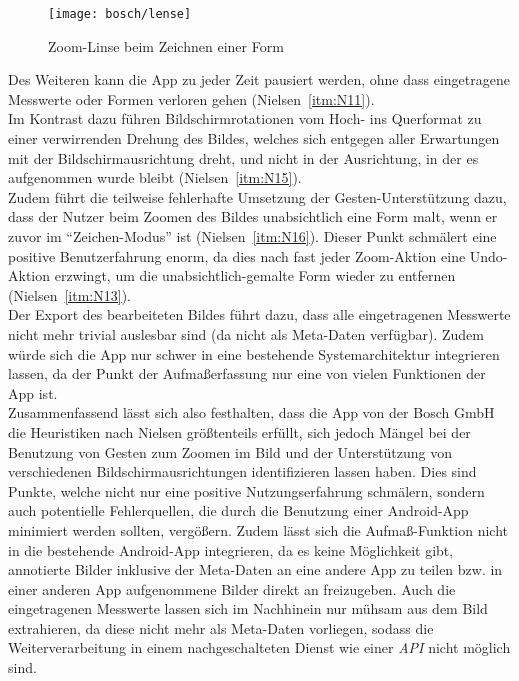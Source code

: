 \begin{wrapfigure}{R}{0.5\textwidth}
  \centering
  \texttt{[image: bosch/lense]}
  \caption{Zoom-Linse beim Zeichnen einer Form}
  \label{fig:blense}
\end{wrapfigure}

Des Weiteren kann die App zu jeder Zeit pausiert werden, ohne dass eingetragene Messwerte oder Formen verloren gehen (Nielsen~\autoref{itm:N11}). \\

Im Kontrast dazu führen Bildschirmrotationen vom Hoch- ins Querformat zu einer verwirrenden Drehung des Bildes, welches sich entgegen aller Erwartungen mit der Bildschirmausrichtung dreht, und nicht in der Ausrichtung, in der es aufgenommen wurde bleibt (Nielsen~\autoref{itm:N15}). \\

Zudem führt die teilweise fehlerhafte Umsetzung der Gesten-Unterstützung dazu, dass der Nutzer beim Zoomen des Bildes unabsichtlich eine Form malt, wenn er zuvor im ``Zeichen-Modus'' ist (Nielsen~\autoref{itm:N16}).
Dieser Punkt schmälert eine positive Benutzerfahrung enorm, da dies nach fast jeder Zoom-Aktion eine Undo-Aktion erzwingt, um die unabsichtlich-gemalte Form wieder zu entfernen (Nielsen~\autoref{itm:N13}). \\

Der Export des bearbeiteten Bildes führt dazu, dass alle eingetragenen Messwerte nicht mehr trivial auslesbar sind (da nicht als Meta-Daten verfügbar). Zudem würde sich die App nur schwer in eine bestehende Systemarchitektur integrieren lassen, da der Punkt der Aufmaßerfassung nur eine von vielen Funktionen der App ist.  \\

Zusammenfassend lässt sich also festhalten, dass die App \mm{} von der Bosch GmbH die Heuristiken nach Nielsen größtenteils erfüllt, sich jedoch Mängel bei der Benutzung von Gesten zum Zoomen im Bild und der Unterstützung von verschiedenen Bildschirmausrichtungen identifizieren lassen haben.
Dies sind Punkte, welche nicht nur eine positive Nutzungserfahrung schmälern, sondern auch potentielle Fehlerquellen, die durch die Benutzung einer Android-App minimiert werden sollten, vergößern.
Zudem lässt sich die Aufmaß-Funktion nicht in die bestehende Android-App integrieren, da es keine Möglichkeit gibt, annotierte Bilder inklusive der Meta-Daten an eine andere App zu teilen bzw. in einer anderen App aufgenommene Bilder direkt an \mm{} freizugeben.
Auch die eingetragenen Messwerte lassen sich im Nachhinein nur mühsam aus dem Bild extrahieren, da diese nicht mehr als Meta-Daten vorliegen, sodass die Weiterverarbeitung in einem nachgeschalteten Dienst wie einer \emph{API} nicht möglich sind.
